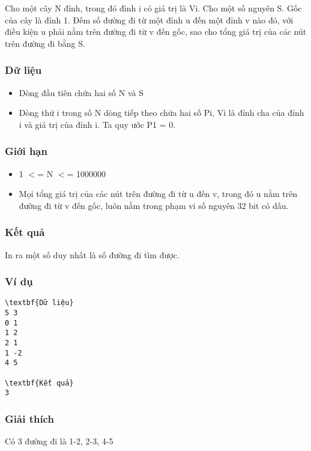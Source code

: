 



   Cho một cây N đỉnh, trong đó đỉnh i có giá trị là Vi. Cho một số nguyên S. Gốc của cây là đỉnh 1. Đếm số đường đi từ một đỉnh u đến một đỉnh v nào đó, với điều kiện u phải nằm trên đường đi từ v đến gốc, sao cho tổng giá trị của các nút trên đường đi bằng S.  

\subsubsection{   Dữ liệu  }
\begin{itemize}
	\item     Dòng đầu tiên chứa hai số N và S   
	\item     Dòng thứ i trong số N dòng tiếp theo chứa hai số Pi, Vi là đỉnh cha của đỉnh i và giá trị của đỉnh i. Ta quy ước P1 = 0.   
\end{itemize}

\subsubsection{   Giới hạn  }
\begin{itemize}
	\item     1 $<$= N $<$= 1000000   
	\item     Mọi tổng giá trị của các nút trên đường đi từ u đến v, trong đó u nằm trên đường đi từ v đến gốc, luôn nằm trong phạm vi số nguyên 32 bit có dấu.   
\end{itemize}

\subsubsection{   Kết quả  }

   In ra một số duy nhất là số đường đi tìm được.  

\subsubsection{   Ví dụ  }
\begin{verbatim}
\textbf{Dữ liệu}
5 3
0 1
1 2
2 1
1 -2
4 5

\textbf{Kết quả}
3
\end{verbatim}

\subsubsection{   Giải thích  }

   Có 3 đường đi là 1-2, 2-3, 4-5  